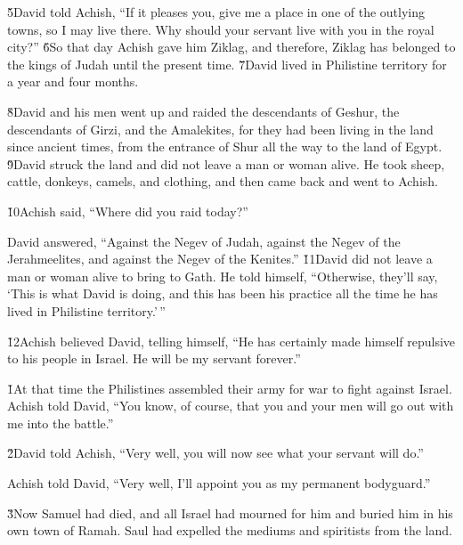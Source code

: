 \v{5}David told Achish, ``If it pleases you, give me a place in one of the outlying towns, so I may live there. Why should your servant live with you in the royal city?'' \v{6}So that day Achish gave him Ziklag, and therefore, Ziklag has belonged to the kings of Judah until the present time. \v{7}David lived in Philistine territory for a year and four months.

\v{8}David and his men went up and raided the descendants of Geshur, the descendants of Girzi, and the Amalekites, for they had been living in the land since ancient times, from the entrance of Shur all the way to the land of Egypt. \v{9}David struck the land and did not leave a man or woman alive. He took sheep, cattle, donkeys, camels, and clothing, and then came back and went to Achish.

\v{10}Achish said, ``Where did you raid today?''

David answered, ``Against the Negev of Judah, against the Negev of the Jerahmeelites, and against the Negev of the Kenites.'' \v{11}David did not leave a man or woman alive to bring to Gath. He told himself, ``Otherwise, they'll say, `This is what David is doing, and this has been his practice all the time he has lived in Philistine territory.'\,''

\v{12}Achish believed David, telling himself, ``He has certainly made himself repulsive to his people in Israel. He will be my servant forever.''

\v{1}At that time the Philistines assembled their army for war to fight against Israel. Achish told David, ``You know, of course, that you and your men will go out with me into the battle.''

\v{2}David told Achish, ``Very well, you will now see what your servant will do.''

Achish told David, ``Very well, I'll appoint you as my permanent bodyguard.''

\v{3}Now Samuel had died, and all Israel had mourned for him and buried him in his own town of Ramah. Saul had expelled the mediums and spiritists from the land.

